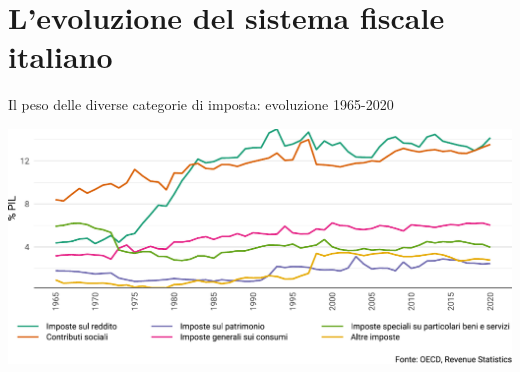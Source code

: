\documentclass[aspectratio=64,11pt]{beamer}
\begin{document}
\section{L'evoluzione del sistema fiscale italiano}

\begin{frame}{Il peso delle diverse categorie di imposta: evoluzione 1965-2020}
\begin{center}
\includegraphics[width=\textwidth]{./figure/evoluzione-struttura-imposte-ITA-color.pdf}
\end{center}
\end{frame}
\end{document}
